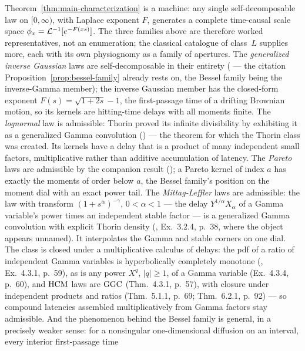 \begin{remark}\label{rem:classical-catalogue}
Theorem~\ref{thm:main-characterization} is a machine: any single self-decomposable
law on $[0,\infty)$, with Laplace exponent $F$, generates a complete time-causal
scale space $\phi_x = \mathcal{L}^{-1}[e^{-F(xs)}]$. The three families above are
therefore worked representatives, not an enumeration; the classical catalogue of
class~$L$ supplies more, each with its own physiognomy as a family of apertures.
The \emph{generalized inverse Gaussian} laws are self-decomposable in their
entirety ( --- the citation
Proposition~\ref{prop:bessel-family} already rests on, the Bessel family being the
inverse-Gamma member); the inverse
Gaussian member has the closed-form exponent $F(s) = \sqrt{1 + 2s} - 1$, the
first-passage time of a drifting Brownian motion, so its kernels are hitting-time
delays with all moments finite. The \emph{lognormal} law is admissible: Thorin
proved its infinite divisibility by exhibiting it as a generalized Gamma
convolution () --- the theorem for which the Thorin
class was created. Its kernels have a delay that is a product of many independent
small factors, multiplicative rather than additive accumulation of latency. The
\emph{Pareto} laws are admissible by the companion result
(); a Pareto kernel of index $a$ has exactly the moments
of order below $a$, the Bessel family's position on the moment dial with an exact
power tail. The \emph{Mittag-Leffler} laws are admissible: the law with transform
$(1 + s^{\alpha})^{-\gamma}$, $0 < \alpha < 1$ --- the delay $Y^{1/\alpha}X_\alpha$
of a Gamma variable's power times an independent stable factor --- is a generalized
Gamma convolution with explicit Thorin density
(, Ex.~3.2.4, p.~38, where the object appears
unnamed). It interpolates the Gamma and stable corners on one dial. The class is
closed under a multiplicative calculus of delays: the pdf of
a ratio of independent Gamma variables is hyperbolically completely monotone
(, Ex.~4.3.1, p.~59), as is any power $X^{q}$,
$|q| \ge 1$, of a Gamma variable (Ex.~4.3.4, p.~60), and $\mathrm{HCM}$ laws are $\mathrm{GGC}$
(Thm.~4.3.1, p.~57), with closure under independent products and ratios
(Thm.~5.1.1, p.~69; Thm.~6.2.1, p.~92) --- so compound latencies assembled
multiplicatively from Gamma factors stay admissible. And the phenomenon behind the
Bessel family is general, in a precisely weaker sense: for a nonsingular
one-dimensional diffusion on an interval, every interior first-passage time

\end{remark}
